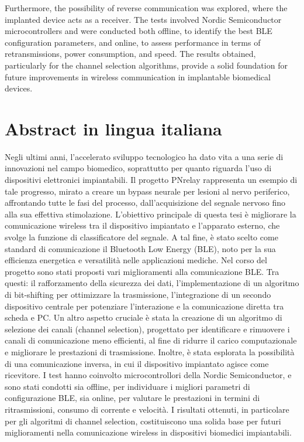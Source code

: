 \documentclass{Configuration_Files/PoliMi3i_thesis}
\begin{document}
Furthermore, the possibility of reverse communication was explored, where the implanted device acts as a receiver. The tests involved Nordic Semiconductor microcontrollers and were conducted both offline, to identify the best BLE configuration parameters, and online, to assess performance in terms of retransmissions, power consumption, and speed. The results obtained, particularly for the channel selection algorithms, provide a solid foundation for future improvements in wireless communication in implantable biomedical devices.

\chapter*{Abstract in lingua italiana}
Negli ultimi anni, l’accelerato sviluppo tecnologico ha dato vita a una serie di innovazioni nel campo biomedico, soprattutto per quanto riguarda l'uso di dispositivi elettronici impiantabili. Il progetto PNrelay rappresenta un esempio di tale progresso, mirato a creare un bypass neurale per lesioni al nervo periferico, affrontando tutte le fasi del processo, dall'acquisizione del segnale nervoso fino alla sua effettiva stimolazione. L’obiettivo principale di questa tesi è migliorare la comunicazione wireless tra il dispositivo impiantato e l'apparato esterno, che svolge la funzione di classificatore del segnale. A tal fine, è stato scelto come standard di comunicazione il Bluetooth Low Energy (BLE), noto per la sua efficienza energetica e versatilità nelle applicazioni mediche.
Nel corso del progetto sono stati proposti vari miglioramenti alla comunicazione BLE. Tra questi: il rafforzamento della sicurezza dei dati, l’implementazione di un algoritmo di bit-shifting per ottimizzare la trasmissione, l'integrazione di un secondo dispositivo centrale per potenziare l'interazione e la comunicazione diretta tra scheda e PC. Un altro aspetto cruciale è stata la creazione di un algoritmo di selezione dei canali (channel selection), progettato per identificare e rimuovere i canali di comunicazione meno efficienti, al fine di ridurre il carico computazionale e migliorare le prestazioni di trasmissione.
Inoltre, è stata esplorata la possibilità di una comunicazione inversa, in cui il dispositivo impiantato agisce come ricevitore. I test hanno coinvolto microcontrollori della Nordic Semiconductor, e sono stati condotti sia offline, per individuare i migliori parametri di configurazione BLE, sia online, per valutare le prestazioni in termini di ritrasmissioni, consumo di corrente e velocità. I risultati ottenuti, in particolare per gli algoritmi di channel selection, costituiscono una solida base per futuri miglioramenti nella comunicazione wireless in dispositivi biomedici impiantabili.
\\
\\
\end{document}

